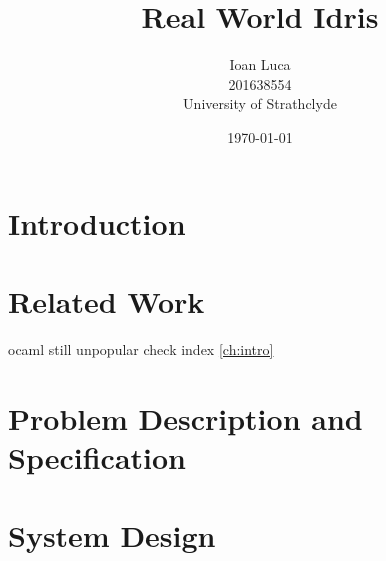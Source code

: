 \documentclass[a4paper,oneside]{report}
\title{Real World Idris}
\author{Ioan Luca \\ 201638554 \\ 
	\small University of Strathclyde} %
\date{\today}
\begin{document}






\tableofcontents


\chapter{Introduction}\label{ch:intro}


\chapter{Related Work}\label{ch:related}


ocaml still unpopular check index \autoref{ch:intro}

\chapter{Problem Description and Specification}\label{ch:spec}


\chapter{System Design}\label{ch:design}

\end{document}
